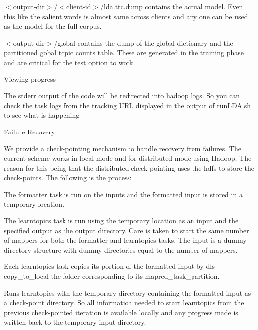 \begin{DoxyEnumerate}
\begin{DoxyEnumerate}
\begin{DoxyEnumerate}
$<$output-\/dir$>$/$<$client-\/id$>$/lda.ttc.dump contains the actual model. Even this like the salient words is almost same across clients and any one can be used as the model for the full corpus. 
\item 

$<$output-\/dir$>$/global contains the dump of the global dictionary and the partitioned gobal topic counts table. These are generated in the training phase and are critical for the test option to work. 
\end{DoxyEnumerate}
\item 

Viewing progress 
\begin{DoxyEnumerate}
\item 

The stderr output of the code will be redirected into hadoop logs. So you can check the task logs from the tracking URL displayed in the output of runLDA.sh to see what is happening 
\end{DoxyEnumerate}
\item 

Failure Recovery 

We provide a check-\/pointing mechanism to handle recovery from failures. The current scheme works in local mode and for distributed mode using Hadoop. The reason for this being that the distributed check-\/pointing uses the hdfs to store the check-\/points. The following is the process:  
\begin{DoxyEnumerate}
\item The formatter task is run on the inputs and the formatted input is stored in a temporary location. 
\item The learntopics task is run using the temporary location as an input and the specified output as the output directory. Care is taken to start the same number of mappers for both the formatter and learntopics tasks. The input is a dummy directory structure with dummy directories equal to the number of mappers. 
\item Each learntopics task copies its portion of the formatted input by dfs copy\_\-to\_\-local the folder corresponding to its mapred\_\-task\_\-partition. 
\item Runs learntopics with the temporary directory containing the formatted input as a check-\/point directory. So all information needed to start learntopics from the previous check-\/pointed iteration is available locally and any progress made is written back to the temporary input directory. 
\end{DoxyEnumerate}


\end{DoxyEnumerate}
\end{DoxyEnumerate}
